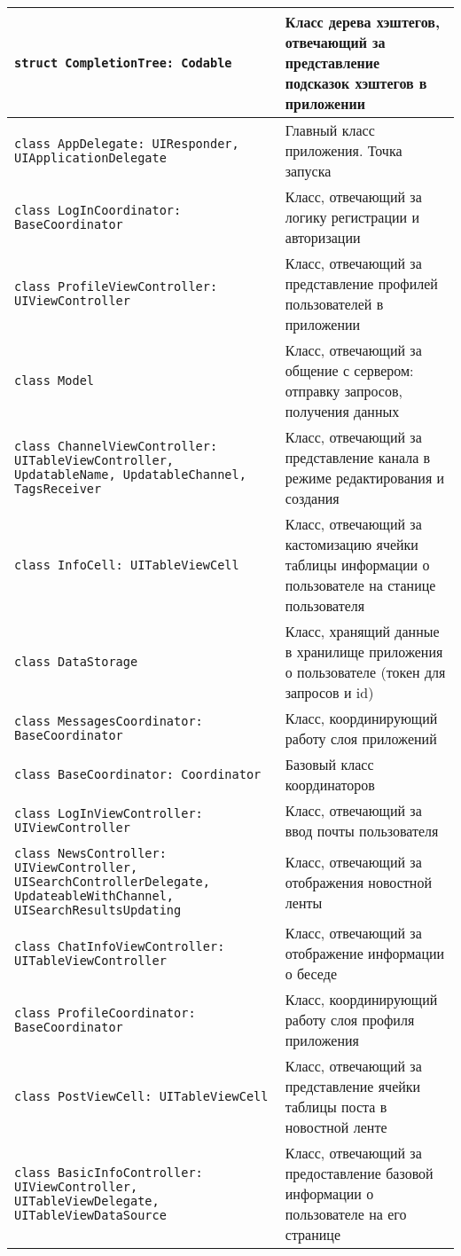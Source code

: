 \begin{longtable}{| >{\raggedright\arraybackslash}p{} | p{}|}
	\texttt{struct CompletionTree: Codable} & {Класс дерева хэштегов, отвечающий за представление подсказок хэштегов в приложении} \\ \hline
\texttt{class AppDelegate: UIResponder, UIApplicationDelegate} & {Главный класс приложения. Точка запуска} \\ \hline
\texttt{class LogInCoordinator: BaseCoordinator} & {Класс, отвечающий за логику регистрации и авторизации} \\ \hline
\texttt{class ProfileViewController: UIViewController} & {Класс, отвечающий за представление профилей пользователей в приложении} \\ \hline
\texttt{class Model} & {Класс, отвечающий за общение с сервером: отправку запросов, получения данных} \\ \hline
\texttt{class ChannelViewController: UITableViewController, UpdatableName, UpdatableChannel, TagsReceiver} & {Класс, отвечающий за представление канала в режиме редактирования и создания} \\ \hline
\texttt{class InfoCell: UITableViewCell} & {Класс, отвечающий за кастомизацию ячейки таблицы информации о пользователе на станице пользователя} \\ \hline
\texttt{class DataStorage} & {Класс, хранящий данные в хранилище приложения о пользователе (токен для запросов и id)} \\ \hline
\texttt{class MessagesCoordinator: BaseCoordinator} & {Класс, координирующий работу слоя приложений} \\ \hline
\texttt{class BaseCoordinator: Coordinator} & {Базовый класс координаторов} \\ \hline
\texttt{class LogInViewController: UIViewController} & {Класс, отвечающий за ввод почты пользователя} \\ \hline
\texttt{class NewsController: UIViewController, UISearchControllerDelegate, UpdateableWithChannel, UISearchResultsUpdating} & {Класс, отвечающий за отображения новостной ленты} \\ \hline
\texttt{class ChatInfoViewController: UITableViewController} & {Класс, отвечающий за отображение информации о беседе} \\ \hline
\texttt{class ProfileCoordinator: BaseCoordinator} & {Класс, координирующий работу слоя профиля приложения} \\ \hline
\texttt{class PostViewCell: UITableViewCell} & {Класс, отвечающий за представление ячейки таблицы поста в новостной ленте} \\ \hline
\texttt{class BasicInfoController: UIViewController, UITableViewDelegate, UITableViewDataSource} & {Класс, отвечающий за предоставление базовой информации о пользователе на его странице} \\ \hline

\end{longtable}
